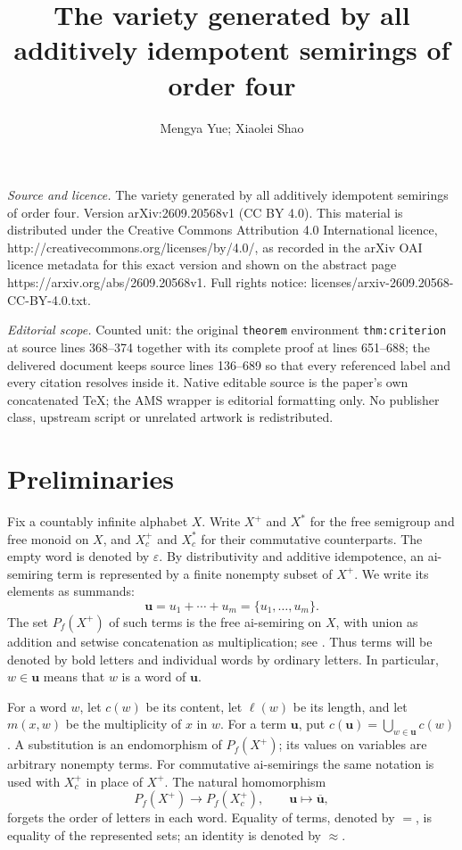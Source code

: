 \documentclass[10pt,a4paper]{amsart}
\newcommand{\eps}{\varepsilon}
\newcommand{\bu}{\mathbf u}
\numberwithin{equation}{section}
\begin{document}
\title[The variety generated by all additively idempotent semirings]{The variety generated by all additively idempotent semirings of order four}
\author{Mengya Yue; Xiaolei Shao}
\date{}
\maketitle
\noindent\emph{Source and licence.} The variety generated by all additively idempotent semirings of order four. Version arXiv:2609.20568v1 (CC BY 4.0). This material is distributed under the Creative Commons Attribution 4.0 International licence, http://creativecommons.org/licenses/by/4.0/, as recorded in the arXiv OAI licence metadata for this exact version and shown on the abstract page https://arxiv.org/abs/2609.20568v1. Full rights notice: licenses/arxiv-2609.20568-CC-BY-4.0.txt.\par\smallskip
\noindent\textit{Editorial scope.} Counted unit: the original \texttt{theorem} environment \texttt{thm:criterion} at source lines 368--374 together with its complete proof at lines 651--688; the delivered document keeps source lines 136--689 so that every referenced label and every citation resolves inside it. Native editable source is the paper's own concatenated TeX; the AMS wrapper is editorial formatting only. No publisher class, upstream script or unrelated artwork is redistributed.
\section{Preliminaries}\label{sec:prelim}

Fix a countably infinite alphabet $X$. Write $X^+$ and $X^*$ for the free
semigroup and free monoid on $X$, and $X_c^+$ and $X_c^*$ for their
commutative counterparts. The empty word is denoted by $\eps$. By
distributivity and additive idempotence, an ai-semiring term is represented
by a finite nonempty subset of $X^+$. We write its elements as summands:
\[
\bu=u_1+\cdots+u_m=\{u_1,\ldots,u_m\}.
\]
The set $P_f(X^+)$ of such terms is the free ai-semiring on $X$, with union
as addition and setwise concatenation as multiplication; see
\cite[Section~1]{RLLC}. Thus terms will be denoted by bold letters and
individual words by ordinary letters. In particular, $w\in\bu$ means that
$w$ is a word of $\bu$.

For a word $w$, let $c(w)$ be its content, let $\ell(w)$ be its length,
and let $m(x,w)$ be the multiplicity of $x$ in $w$. For a term $\bu$, put
$c(\bu)=\bigcup_{w\in\bu}c(w)$. A substitution is an endomorphism of
$P_f(X^+)$; its values on variables are arbitrary nonempty terms. For
commutative ai-semirings the same notation is used with $X_c^+$ in place
of $X^+$. The natural homomorphism
\[
P_f(X^+)\longrightarrow P_f(X_c^+),\qquad \bu\longmapsto\overline{\bu},
\]
forgets the order of letters in each word. Equality of terms, denoted by
$=$, is equality of the represented sets; an identity is denoted by
$\approx$.
\end{document}
